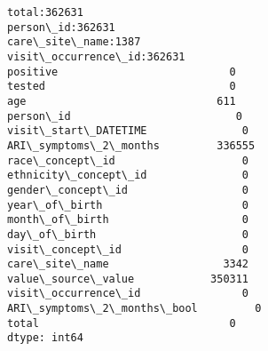 \documentclass[11pt]{article}
\begin{document}
    \begin{Verbatim}[commandchars=\\\{\}]
total:362631
person\_id:362631
care\_site\_name:1387
visit\_occurrence\_id:362631
positive                           0
tested                             0
age                              611
person\_id                          0
visit\_start\_DATETIME               0
ARI\_symptoms\_2\_months         336555
race\_concept\_id                    0
ethnicity\_concept\_id               0
gender\_concept\_id                  0
year\_of\_birth                      0
month\_of\_birth                     0
day\_of\_birth                       0
visit\_concept\_id                   0
care\_site\_name                  3342
value\_source\_value            350311
visit\_occurrence\_id                0
ARI\_symptoms\_2\_months\_bool         0
total                              0
dtype: int64

    \end{Verbatim}
\end{document}
